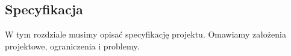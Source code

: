 \subsection{Specyfikacja}
W tym rozdziale musimy opisać specyfikację projektu. Omawiamy założenia projektowe, ograniczenia i problemy.

